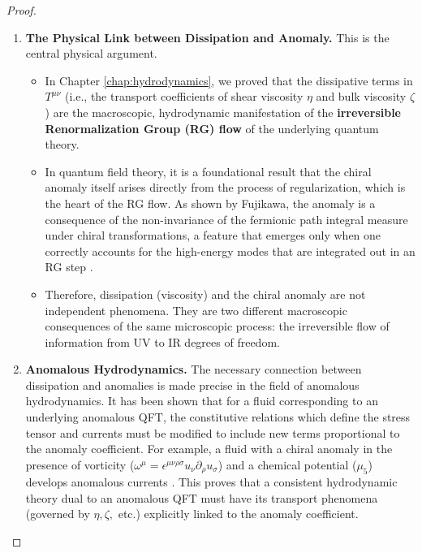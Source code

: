 \documentclass[11pt, letterpaper]{report}
\theoremstyle{plain} %
\theoremstyle{definition} %
\theoremstyle{remark} %
\begin{document}
\begin{proof}
\begin{enumerate}
    \item \textbf{The Physical Link between Dissipation and Anomaly.} This is the central physical argument.
    \begin{itemize}
        \item In Chapter \ref{chap:hydrodynamics}, we proved that the dissipative terms in $T^{\mu\nu}$ (i.e., the transport coefficients of shear viscosity $\eta$ and bulk viscosity $\zeta$) are the macroscopic, hydrodynamic manifestation of the \textbf{irreversible Renormalization Group (RG) flow} of the underlying quantum theory.
        \item In quantum field theory, it is a foundational result that the chiral anomaly itself arises directly from the process of regularization, which is the heart of the RG flow. As shown by Fujikawa, the anomaly is a consequence of the non-invariance of the fermionic path integral measure under chiral transformations, a feature that emerges only when one correctly accounts for the high-energy modes that are integrated out in an RG step \cite{Fujikawa1979PathIntegral}.
        \item Therefore, dissipation (viscosity) and the chiral anomaly are not independent phenomena. They are two different macroscopic consequences of the same microscopic process: the irreversible flow of information from UV to IR degrees of freedom.
    \end{itemize}

    \item \textbf{Anomalous Hydrodynamics.} The necessary connection between dissipation and anomalies is made precise in the field of anomalous hydrodynamics. It has been shown that for a fluid corresponding to an underlying anomalous QFT, the constitutive relations which define the stress tensor and currents must be modified to include new terms proportional to the anomaly coefficient. For example, a fluid with a chiral anomaly in the presence of vorticity ($\omega^\mu = \epsilon^{\mu\nu\rho\sigma}u_\nu\partial_\rho u_\sigma$) and a chemical potential ($\mu_5$) develops anomalous currents \cite{Son2009AnomalousHydro}. This proves that a consistent hydrodynamic theory dual to an anomalous QFT must have its transport phenomena (governed by $\eta, \zeta,$ etc.) explicitly linked to the anomaly coefficient.


\end{enumerate}
\end{proof}
\end{document}

